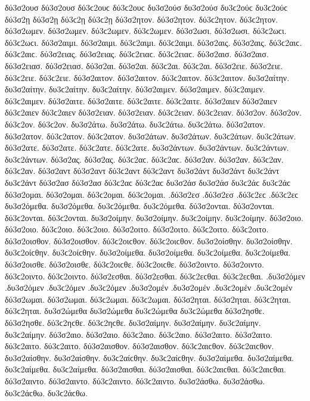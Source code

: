 {δύ3σ2ουσ δύ3σ2ουσ δύ3ϲ2ουϲ δύ3ϲ2ουϲ δυ3σ2ούσ δυ3σ2ούσ δυ3ϲ2ούϲ δυ3ϲ2ούϲ 
δύ3σ2ῃ δύ3σ2ῃ δύ3ϲ2ῃ δύ3ϲ2ῃ 
δύ3σ2ητον. δύ3σ2ητον. δύ3ϲ2ητον. δύ3ϲ2ητον. 
δύ3σ2ωμεν. δύ3σ2ωμεν. δύ3ϲ2ωμεν. δύ3ϲ2ωμεν. 
δύ3σ2ωσι. δύ3σ2ωσι. δύ3ϲ2ωϲι. δύ3ϲ2ωϲι. 
δύ3σ2αιμι. δύ3σ2αιμι. δύ3ϲ2αιμι. δύ3ϲ2αιμι. 
δύ3σ2αις. δύ3σ2αις. δύ3ϲ2αιϲ. δύ3ϲ2αιϲ. δύ3σ2ειας. δύ3σ2ειας. δύ3ϲ2ειαϲ. δύ3ϲ2ειαϲ. 
δύ3σ2αισ. δύ3σ2αισ. δύ3σ2ειασ. δύ3σ2ειασ. 
δύ3σ2αι. δύ3σ2αι. δύ3ϲ2αι. δύ3ϲ2αι. δύ3σ2ειε. δύ3σ2ειε. δύ3ϲ2ειε. δύ3ϲ2ειε. 
δύ3σ2αιτον. δύ3σ2αιτον. δύ3ϲ2αιτον. δύ3ϲ2αιτον. 
δυ3σ2αίτην. δυ3σ2αίτην. δυ3ϲ2αίτην. δυ3ϲ2αίτην. 
δύ3σ2αιμεν. δύ3σ2αιμεν. δύ3ϲ2αιμεν. δύ3ϲ2αιμεν. 
δύ3σ2αιτε. δύ3σ2αιτε. δύ3ϲ2αιτε. δύ3ϲ2αιτε. 
δύ3σ2αιεν δύ3σ2αιεν δύ3ϲ2αιεν δύ3ϲ2αιεν δύ3σ2ειαν. δύ3σ2ειαν. δύ3ϲ2ειαν. δύ3ϲ2ειαν. 
δύ3σ2ον. δύ3σ2ον. δύ3ϲ2ον. δύ3ϲ2ον. 
δυ3σ2άτω. δυ3σ2άτω. δυ3ϲ2άτω. δυ3ϲ2άτω. 
δύ3σ2ατον. δύ3σ2ατον. δύ3ϲ2ατον. δύ3ϲ2ατον. 
δυ3σ2άτων. δυ3σ2άτων. δυ3ϲ2άτων. δυ3ϲ2άτων. 
δύ3σ2ατε. δύ3σ2ατε. δύ3ϲ2ατε. δύ3ϲ2ατε. 
δυ3σ2άντων. δυ3σ2άντων. δυ3ϲ2άντων. δυ3ϲ2άντων. 
δύ3σ2ας. δύ3σ2ας. δύ3ϲ2αϲ. δύ3ϲ2αϲ. δύ3σ2αν. δύ3σ2αν. δύ3ϲ2αν. δύ3ϲ2αν. δύ3σ2αντ δύ3σ2αντ δύ3ϲ2αντ δύ3ϲ2αντ δυ3σ2άντ δυ3σ2άντ δυ3ϲ2άντ δυ3ϲ2άντ 
δύ3σ2ασ δύ3σ2ασ δύ3ϲ2αϲ δύ3ϲ2αϲ δυ3σ2άσ δυ3σ2άσ δυ3ϲ2άϲ δυ3ϲ2άϲ 
δύ3σ2ομαι. δύ3σ2ομαι. δύ3ϲ2ομαι. δύ3ϲ2ομαι. 
.δύ3σ2εσ .δύ3σ2εσ .δύ3ϲ2εϲ .δύ3ϲ2εϲ 
δυ3σ2όμεθα. δυ3σ2όμεθα. δυ3ϲ2όμεθα. δυ3ϲ2όμεθα. 
δύ3σ2ονται. δύ3σ2ονται. δύ3ϲ2ονται. δύ3ϲ2ονται. 
δυ3σ2οίμην. δυ3σ2οίμην. δυ3ϲ2οίμην. δυ3ϲ2οίμην. 
δύ3σ2οιο. δύ3σ2οιο. δύ3ϲ2οιο. δύ3ϲ2οιο. 
δύ3σ2οιτο. δύ3σ2οιτο. δύ3ϲ2οιτο. δύ3ϲ2οιτο. 
δύ3σ2οισθον. δύ3σ2οισθον. δύ3ϲ2οιϲθον. δύ3ϲ2οιϲθον. 
δυ3σ2οίσθην. δυ3σ2οίσθην. δυ3ϲ2οίϲθην. δυ3ϲ2οίϲθην. 
δυ3σ2οίμεθα. δυ3σ2οίμεθα. δυ3ϲ2οίμεθα. δυ3ϲ2οίμεθα. 
δύ3σ2οισθε. δύ3σ2οισθε. δύ3ϲ2οιϲθε. δύ3ϲ2οιϲθε. 
δύ3σ2οιντο. δύ3σ2οιντο. δύ3ϲ2οιντο. δύ3ϲ2οιντο. 
δύ3σ2εσθαι. δύ3σ2εσθαι. δύ3ϲ2εϲθαι. δύ3ϲ2εϲθαι. 
.δυ3σ2όμεν .δυ3σ2όμεν .δυ3ϲ2όμεν .δυ3ϲ2όμεν   %
.δυ3σ2ομέν .δυ3σ2ομέν .δυ3ϲ2ομέν .δυ3ϲ2ομέν 
δύ3σ2ωμαι. δύ3σ2ωμαι. δύ3ϲ2ωμαι. δύ3ϲ2ωμαι. 
δύ3σ2ηται. δύ3σ2ηται. δύ3ϲ2ηται. δύ3ϲ2ηται. 
δυ3σ2ώμεθα δυ3σ2ώμεθα δυ3ϲ2ώμεθα δυ3ϲ2ώμεθα 
δύ3σ2ησθε. δύ3σ2ησθε. δύ3ϲ2ηϲθε. δύ3ϲ2ηϲθε. 
δυ3σ2αίμην. δυ3σ2αίμην. δυ3ϲ2αίμην. δυ3ϲ2αίμην. 
δύ3σ2αιο. δύ3σ2αιο. δύ3ϲ2αιο. δύ3ϲ2αιο. 
δύ3σ2αιτο. δύ3σ2αιτο. δύ3ϲ2αιτο. δύ3ϲ2αιτο. 
δύ3σ2αισθον. δύ3σ2αισθον. δύ3ϲ2αιϲθον. δύ3ϲ2αιϲθον. 
δυ3σ2αίσθην. δυ3σ2αίσθην. δυ3ϲ2αίϲθην. δυ3ϲ2αίϲθην. 
δυ3σ2αίμεθα. δυ3σ2αίμεθα. δυ3ϲ2αίμεθα. δυ3ϲ2αίμεθα. 
δύ3σ2αισθαι. δύ3σ2αισθαι. δύ3ϲ2αιϲθαι. δύ3ϲ2αιϲθαι. 
δύ3σ2αιντο. δύ3σ2αιντο. δύ3ϲ2αιντο. δύ3ϲ2αιντο. 
δυ3σ2άσθω. δυ3σ2άσθω. δυ3ϲ2άϲθω. δυ3ϲ2άϲθω. 
}
